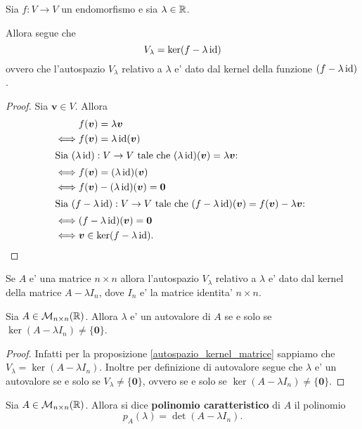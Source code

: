 \begin{proposition}
    Sia $f : V \to V$ un endomorfismo e sia $\lambda \in \mathbb{R}$. 
    
    Allora segue che \[
        V_{\lambda} = \ker (f - \lambda\operatorname{id})    
    \] ovvero che l'autospazio $V_{\lambda}$ relativo a $\lambda$ e' dato dal kernel della funzione $(f - \lambda\operatorname{id})$.
\end{proposition}
\begin{proof}
    Sia $\bm v \in V$. Allora \begin{alignat*}
        {1}
        &f(\bm v) = \lambda\bm v \\
        \iff &f(\bm v) = \lambda\operatorname{id}(\bm v)\\
        \intertext{Sia $(\lambda\operatorname{id}) : V \to V$ tale che $(\lambda\operatorname{id})(\bm v) = \lambda \bm v$: }
        \iff &f(\bm v) = (\lambda\operatorname{id})(\bm v)\\
        \iff &f(\bm v) - (\lambda\operatorname{id})(\bm v) = \bm 0\\
        \intertext{Sia $(f - \lambda\operatorname{id}) : V \to V$ tale che $(f - \lambda\operatorname{id})(\bm v) = f(\bm v) - \lambda \bm v$: }
        \iff &(f - \lambda\operatorname{id})(\bm v) = \bm 0\\
        \iff &\bm v \in \ker (f - \lambda\operatorname{id}). \tag*{\qedhere}
    \end{alignat*}
\end{proof}

\begin{corollary}\label{autospazio_kernel_matrice}
    Se $A$ e' una matrice $n \times n$ allora l'autospazio $V_{\lambda}$ relativo a $\lambda$ e' dato dal kernel della matrice $A - \lambda I_n$, dove $I_n$ e' la matrice identita' $n \times n$.
\end{corollary}

\begin{proposition}\label{autovalore_sse_kernel_nonnullo}
    Sia $A \in \mathcal{M}_{n \times n}(\mathbb{R})$. Allora $\lambda$ e' un autovalore di $A$ se e solo se $\ker (A - \lambda I_n) \neq \{\bm 0\}$. 
\end{proposition}
\begin{proof}
    Infatti per la proposizione \ref{autospazio_kernel_matrice} sappiamo che $V_{\lambda} = \ker (A - \lambda I_n)$. Inoltre per definizione di autovalore segue che $\lambda$ e' un autovalore se e solo se $V_{\lambda} \neq \{\bm 0\}$, ovvero se e solo se $\ker (A - \lambda I_n) \neq \{\bm 0\}$.
\end{proof}

\begin{definition}
    Sia $A \in \mathcal{M}_{n \times n}(\mathbb{R})$. Allora si dice \textbf{polinomio caratteristico} di $A$ il polinomio \[
        p_A(\lambda) = \det (A - \lambda I_n). 
    \]
\end{definition}

